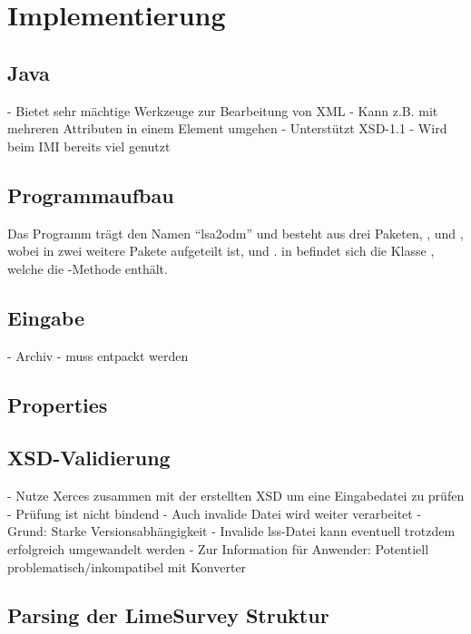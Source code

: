 \section{Implementierung}

\subsection{Java}

- Bietet sehr mächtige Werkzeuge zur Bearbeitung von XML
	- Kann z.B. mit mehreren Attributen in einem Element umgehen
	- Unterstützt XSD-1.1
- Wird beim IMI bereits viel genutzt

\subsection{Programmaufbau}

Das Programm trägt den Namen \enquote{lsa2odm} und besteht aus drei Paketen, ,  und , wobei  in zwei weitere Pakete aufgeteilt ist,  und .
in  befindet sich die Klasse , welche die -Methode enthält.

\subsection{Eingabe}

- Archiv
	- muss entpackt werden

\subsection{Properties}

\subsection{XSD-Validierung}

- Nutze Xerces zusammen mit der erstellten XSD um eine Eingabedatei zu prüfen
- Prüfung ist nicht bindend
	- Auch invalide Datei wird weiter verarbeitet
	- Grund: Starke Versionsabhängigkeit
		- Invalide lss-Datei kann eventuell trotzdem erfolgreich umgewandelt werden
	- Zur Information für Anwender: Potentiell problematisch/inkompatibel mit Konverter

\subsection{Parsing der LimeSurvey Struktur}

